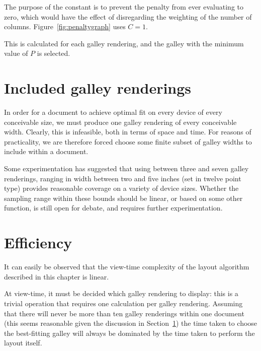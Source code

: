 The purpose of the constant is to prevent the penalty from ever evaluating to zero, which would have the effect of disregarding the weighting of the number of columns. Figure~\ref{fig:penaltygraph} uses $C=1$.

This is calculated for each galley rendering, and the galley with the minimum value of $P$ is selected.

\section{Included galley renderings}
\label{sec:inc-renderings}
In order for a document to achieve optimal fit on every device of every conceivable size, we must produce one galley rendering of every conceivable width. Clearly, this is infeasible, both in terms of space and time. For reasons of practicality, we are therefore forced choose some finite subset of galley widths to include within a document.

Some experimentation has suggested that using between three and seven galley renderings, ranging in width between two and five inches (set in twelve point type) provides reasonable coverage on a variety of device sizes. Whether the sampling range within these bounds should be linear, or based on some other function, is still open for debate, and requires further experimentation.




\section{Efficiency}

It can easily be observed that the view-time complexity of the layout algorithm described in this chapter is linear.

At view-time, it must be decided which galley rendering to display: this is a trivial operation that requires one calculation per galley rendering. Assuming that there will never be more than ten galley renderings within one document (this seems reasonable given the discussion in Section~\ref{sec:inc-renderings}) the time taken to choose the best-fitting galley will always be dominated by the time taken to perform the layout itself.

